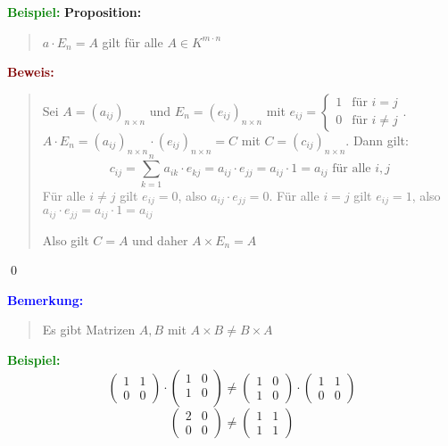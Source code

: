 \documentclass{article}
\newcommand{\mesp}{\phantom{\hspace{10px}}}
\newcommand{\gray}[1]{\textcolor{gray}{#1}}
\newcommand{\blue}[1]{\textcolor{blue}{#1}}
\newcommand{\green}[1]{\textcolor{green}{#1}}
\newcommand{\dgr}[1]{\textcolor{dgr}{#1}}
\newcommand{\maroon}[1]{\textcolor{maroon}{#1}}
\newcommand{\ex}{\green{\textbf{Beispiel: }}}
\newcommand{\an}[1]{\blue{\textbf{Bemerkung: }}\begin{quote}#1\end{quote}}
\newcommand{\prop}[1]{\dgr{\textbf{Proposition: }}\begin{quote}#1\end{quote}}
\newcommand{\pr}[1]{\maroon{\textbf{Beweis: }}\begin{quote}#1\end{quote}\qed}
\begin{document}
\ex \prop{$a \cdot E_n = A$ gilt für alle $A \in K^{m \cdot n}$}
\mesp
\pr{
    Sei $A = (a_{ij})_{n \times n}$ und $E_n = (e_{ij})_{n \times n}$ mit $e_{ij} = 
    \begin{cases}
        1 & \text{für } i = j\\
        0 & \text{für } i \neq j
    \end{cases}$.
    $A \cdot E_n = (a_{ij})_{n \times n} \cdot (e_{ij})_{n \times n} = C$ mit $C = (c_{ij})_{n \times n}$.
    Dann gilt:
    \begin{equation*}
        c_{ij} = \sum_{k = 1}^{n} a_{ik} \cdot e_{kj} = a_{ij} \cdot e_{jj} = a_{ij} \cdot 1 = a_{ij} \text{ für alle } i, j
    \end{equation*}
    \gray{
        Für alle $i \neq j$ gilt $e_{ij} = 0$, also $a_{ij} \cdot e_{jj} = 0$. Für alle $i = j$ gilt $e_{ij} = 1$, also $a_{ij} \cdot e_{jj} = a_{ij} \cdot 1 = a_{ij}$
    }

    Also gilt $C = A$ und daher $A \times E_n = A$
}

\an{Es gibt Matrizen $A, B$ mit $A \times B \neq B \times A$}
\ex 
\begin{equation*}
    \begin{pmatrix}
        1 & 1\\
        0 & 0
    \end{pmatrix}
    \cdot
    \begin{pmatrix}
        1 & 0\\
        1 & 0\\
    \end{pmatrix}
    \neq
    \begin{pmatrix}
        1 & 0\\
        1 & 0
    \end{pmatrix}
    \cdot
    \begin{pmatrix}
        1 & 1\\
        0 & 0
    \end{pmatrix}
\end{equation*}
\begin{equation*}
    \begin{pmatrix}
        2 & 0\\
        0 & 0
    \end{pmatrix}
    \neq
    \begin{pmatrix}
        1 & 1\\
        1 & 1
    \end{pmatrix}
\end{equation*}
\end{document}
